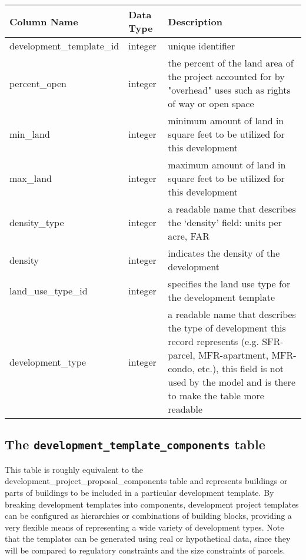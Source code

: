 \begin{tabular}{p{2in}lp{3.5in}}
\textbf{Column Name} & \textbf{Data Type} & \textbf{Description} \\
\hline
development\_template\_id & integer & unique identifier\\ \hline
percent\_open & integer & the percent of the land area of the project accounted for by "overhead" uses such as rights of way or open space\\ \hline
min\_land & integer & minimum amount of land in square feet to be utilized for this development\\ \hline
max\_land & integer & maximum amount of land in square feet to be utilized for this development\\ \hline
density\_type & integer & a readable name that describes the `density' field: units per acre, FAR\\ \hline
density & integer & indicates the density of the development\\ \hline
land\_use\_type\_id & integer & specifies the land use type for the development template\\ \hline
development\_type & integer & a readable name that describes the type of development this record represents (e.g. SFR-parcel, MFR-apartment, MFR-condo, etc.), this field is not used by the model and is there to make the table more readable \\ \hline
\end{tabular}

\subsection{The {\tt development\_template\_components} table}
\label{sec:db-tables-development-template-components}

This table is roughly equivalent to the development\_project_proposal_components table and represents buildings or parts 
of buildings to be included in a particular development template.  By breaking development templates into components, 
development project templates can be configured as hierarchies or combinations of building blocks, providing a very flexible 
means of representing a wide variety of development types.  Note that the templates can be generated using real or hypothetical data, 
since they will be compared to regulatory constraints and the size constraints of parcels.



